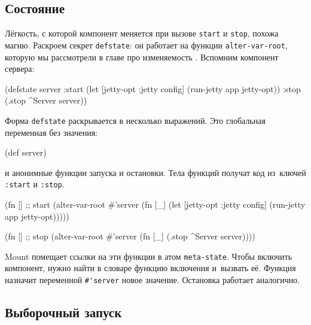 \subsection{Состояние}


Лёгкость, с которой компонент меняется при вызове \verb|start| и
\verb|stop|, похожа магию. Раскроем секрет \verb|defstate|: он работает на
функции \verb|alter-var-root|, которую мы рассмотрели в главе про
изменяемость . Вспомним компонент сервера:

\begin{english}
  \begin{clojure}
(defstate server
  :start (let [{jetty-opt :jetty} config]
           (run-jetty app jetty-opt))
  :stop (.stop ^Server server))
  \end{clojure}
\end{english}

Форма \verb|defstate| раскрывается в несколько выражений. Это глобальная
переменная без значения:


\begin{english}
  \begin{clojure}
(def server)
  \end{clojure}
\end{english}

\noindent
и анонимные функции запуска и остановки. Тела функций получат код из~ключей
\verb|:start| и \verb|:stop|.

\begin{english}
  \begin{clojure}
(fn [] ;; start
  (alter-var-root #'server
   (fn [_]
     (let [{jetty-opt :jetty} config]
       (run-jetty app jetty-opt)))))

(fn [] ;; stop
  (alter-var-root #'server
   (fn [_]
     (.stop ^Server server))))
  \end{clojure}
\end{english}

Mount помещает ссылки на эти функции в атом \verb|meta-state|. Чтобы включить
компонент, нужно найти в словаре функцию включения и~вызвать её. Функция
назначит переменной \verb|#'server| новое значение. Остановка работает
аналогично.

\subsection{Выборочный запуск}

